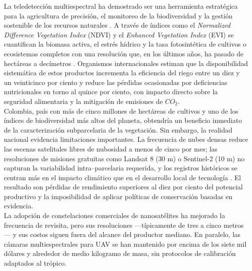 \noindent La teledetección multiespectral ha demostrado ser una herramienta
estratégica para la agricultura de precisión, el monitoreo de la
biodiversidad y la gestión sostenible de los recursos naturales \cite{Chuvieco2010}.  A
través de índices como el \emph{Normalized Difference Vegetation Index}
(NDVI) y el \emph{Enhanced Vegetation Index} (EVI) se cuantifican la
biomasa activa, el estrés hídrico y la tasa fotosintética de cultivos o
ecosistemas completos con una resolución que, en los últimos años, ha
pasado de hectáreas a decímetros \cite{Xue2017Significant}.  Organismos internacionales estiman
que la disponibilidad sistemática de estos productos incrementa la
eficiencia del riego entre un diez y un veinticinco por ciento y reduce
las pérdidas ocasionadas por deficiencias nutricionales en torno al
quince por ciento, con impacto directo sobre la seguridad alimentaria y
la mitigación de emisiones de \(CO_2\).\\

\noindent Colombia, país con más de cinco millones de hectáreas de cultivos y uno
de los índices de biodiversidad más altos del planeta, obtendría un
beneficio inmediato de la caracterización subparcelaria de la
vegetación.  Sin embargo, la realidad nacional evidencia limitaciones
importantes.  La frecuencia de nubes densas reduce las escenas satelitales libres
de nubosidad a menos de cinco por mes; las resoluciones de misiones
gratuitas como Landsat 8 (30 m) o Sentinel-2 (10 m) no capturan la
variabilidad intra–parcelaria requerida, y los registros históricos se
centran más en el impacto climático que en el desarrollo local de
tecnología \cite{Poveda2001SeasonalityColombia}.  El resultado son
pérdidas de rendimiento superiores al diez por ciento del potencial
productivo y la imposibilidad de aplicar políticas de conservación
basadas en evidencia.\\

\noindent La adopción de constelaciones comerciales de nanosatélites ha mejorado la
frecuencia de revisita, pero sus resoluciones —típicamente de tres a
cinco metros— y sus costos siguen fuera del alcance del productor
mediano.  En paralelo, las cámaras multiespectrales para UAV se han
mantenido por encima de los siete mil dólares y alrededor de medio
kilogramo de masa, sin protocolos de calibración adaptados al trópico.\\

